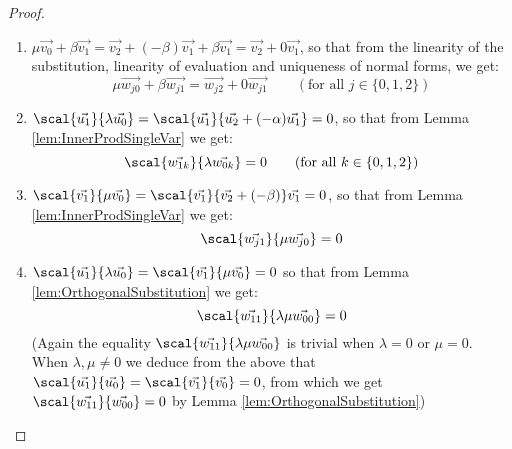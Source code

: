 \begin{lemma}
\begin{proof}
\begin{enumerate}
        \item\label{A9:it2} $\mu\vec{v_0} + \beta\vec{v_1}=\vec{v_2} + (-\beta) \vec{v_1} + \beta \vec{v_1} = \vec{v_2} + 0 \vec{v_1}$, so that from the linearity of the substitution, linearity of evaluation and uniqueness of normal forms, we get:
        \[
        \mu\vec{w_{j0}} + \beta \vec{w_{j1}} = \vec{w_{j2}} + 0 \vec{w_{j1}} \qquad(\text{for all }j\in\{0,1,2\})
        \]
        
        \item\label{A9:it3} $\scal{\vec{u_1}}{\lambda\vec{u_0}}=\scal{\vec{u_1}}{\vec{u_2}+(- \alpha)\vec{u_1}}=0$, so that from Lemma \ref{lem:InnerProdSingleVar} we get:
        \[
        \scal{\vec{w_{1k}}}{\lambda\vec{w_{0k}}}= 0 \qquad(\text{for all }k\in\{0,1,2\})
        \]
        
        \item\label{A9:it4} $\scal{\vec{v_1}}{\mu\vec{v_0}}=\scal{\vec{v_1}}{\vec{v_2} + (-\beta)}\vec{v_1}=0$, so that from Lemma \ref{lem:InnerProdSingleVar} we get:
        \[
        \scal{\vec{w_{j1}}}{\mu\vec{w_{j0}}}=0
        \]
                
        \item\label{A9:it5} $\scal{\vec{u_1}}{\lambda\vec{u_0}}=\scal{\vec{v_1}}{\mu\vec{v_0}}=0$ so that from Lemma \ref{lem:OrthogonalSubstitution} we get:
        \[
        \scal{\vec{w_{11}}}{\lambda\mu\vec{w_{00}}}=0
        \]
        (Again the equality $\scal{\vec{w_{11}}}{\lambda\mu\vec{w_{00}}}$ is trivial when $\lambda=0$ or $\mu=0$. When $\lambda ,\mu\neq 0$ we deduce from the above that $\scal{\vec{u_1}}{\vec{u_0}}=\scal{\vec{v_1}}{\vec{v_0}}=0$, from which we get $\scal{\vec{w_{11}}}{\vec{w_{00}}}=0$ by Lemma \ref{lem:OrthogonalSubstitution})
    \end{enumerate}


\end{proof}
\end{lemma}
